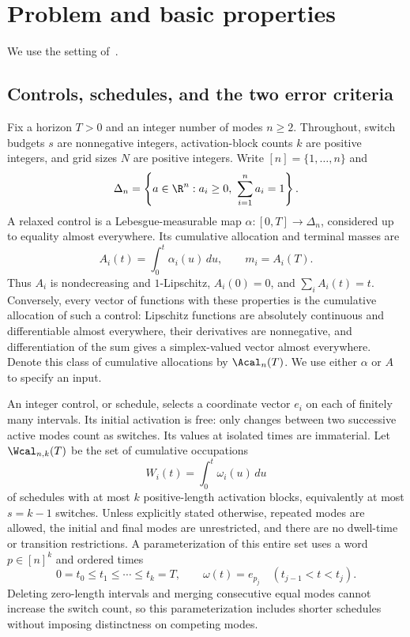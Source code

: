 \section{Problem and basic properties}\label{sec:foundations}

We use the setting of~\cite{sager-zeile2021}.

\subsection{Controls, schedules, and the two error criteria}

Fix a horizon $T>0$ and an integer number of modes $n\ge2$. Throughout,
switch budgets $s$ are nonnegative integers, activation-block counts $k$ are
positive integers, and grid sizes $N$ are positive integers. Write
$[n]=\{1,\ldots,n\}$ and
\[
 \Delta_n=\left\{a\in\R^n:a_i\ge0,\ \sum_{i=1}^n a_i=1\right\}.
\]
A relaxed control is a Lebesgue-measurable map
$\alpha:[0,T]\to\Delta_n$, considered up to equality almost everywhere.
Its cumulative allocation and terminal masses are
\begin{equation}\label{eq:cumulatives}
 A_i(t)=\int_0^t\alpha_i(u)\,du,\qquad m_i=A_i(T).
\end{equation}
Thus $A_i$ is nondecreasing and $1$-Lipschitz, $A_i(0)=0$, and
$\sum_i A_i(t)=t$. Conversely, every vector of functions with these properties
is the cumulative allocation of such a control: Lipschitz functions are
absolutely continuous and differentiable almost everywhere, their derivatives
are nonnegative, and differentiation of the sum gives a simplex-valued
vector almost everywhere. Denote this class of cumulative allocations by
$\Acal_n(T)$. We use either $\alpha$ or $A$ to specify an input.

An integer control, or schedule, selects a coordinate vector $e_i$ on each of
finitely many intervals. Its initial activation is free: only changes between
two successive active modes count as switches. Its values at isolated times
are immaterial. Let $\Wcal_{n,k}(T)$ be the set of cumulative occupations
\[
 W_i(t)=\int_0^t\omega_i(u)\,du
\]
of schedules with at most $k$ positive-length activation blocks, equivalently
at most $s=k-1$ switches. Unless explicitly stated otherwise, repeated modes
are allowed, the initial and final modes are unrestricted, and there are no
dwell-time or transition restrictions. A parameterization of this entire set
uses a word $p\in[n]^k$ and ordered times
\begin{equation}\label{eq:schedule-parameterization}
 0=t_0\le t_1\le\cdots\le t_k=T,\qquad
 \omega(t)=e_{p_j}\quad(t_{j-1}<t<t_j).
\end{equation}
Deleting zero-length intervals and merging consecutive equal modes cannot
increase the switch count, so this parameterization includes shorter
schedules without imposing distinctness on competing modes.

